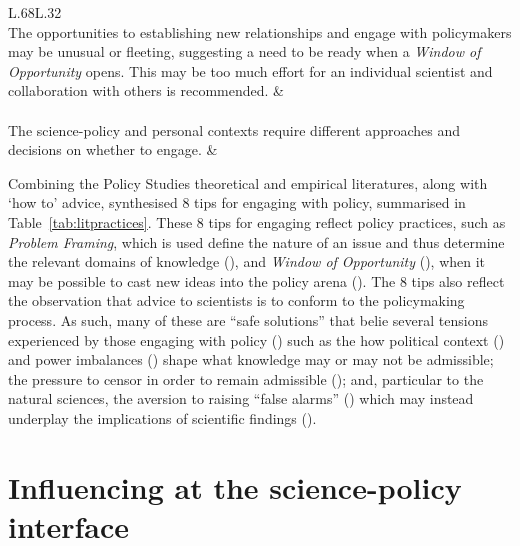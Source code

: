 \begin{table}[!ht]
\begin{tabular}{L{.68\linewidth}L{.32\linewidth}}
 \\
The opportunities to establishing new relationships and engage with policymakers may be unusual or fleeting, suggesting a need to be ready when a \emph{Window of Opportunity} opens. This may be too much effort for an individual scientist and collaboration with others is recommended.	 & 	\textcite{RoseBOP2018} \\ \hline
{} \\
The science-policy and personal contexts require different approaches and decisions on whether to engage. & 	\textcite{OjanenBKP2021,Obermeister2022} \\
\hline
\end{tabular}
\end{table}

Combining the Policy Studies theoretical and empirical literatures, along with `how to' advice, \textcite{OliverC2019} synthesised 8 tips for engaging with policy, summarised in Table~\ref{tab:litpractices}. These 8 tips for engaging reflect policy practices, such as \emph{Problem Framing}, which is used define the nature of an issue and thus determine the relevant domains of knowledge (\cite{OECD2015,MoallemiZHSMZHKHMGLB2023}), and \emph{Window of Opportunity} (\cite{Kingdon1993}), when it may be possible to cast new ideas into the policy arena (\cite{RoseBOP2018}). The 8 tips also reflect the observation that advice to scientists is to conform to the policymaking process. As such, many of these are ``safe solutions'' that belie several tensions experienced by those engaging with policy (\cite{CairneyO2020}) such as the how political context (\cite{SaxonbergSL2023,WesselinkH2020}) and power imbalances (\cite{TurnhoutMWKL2020,OjanenBKP2021,StrassheimK2014}) shape what knowledge may or may not be admissible; the pressure to censor in order to remain admissible (\cite{Pearce2024,OjanenBKP2021}); and, particular to the natural sciences, the aversion to raising ``false alarms'' (\cite{ReadO2017,PoeS2023}) which may instead underplay the implications of \CAN{} scientific findings (\cite{CalverleyA2022}). 

\section{Influencing at the science-policy interface}\label{sec:litinfluencing}

